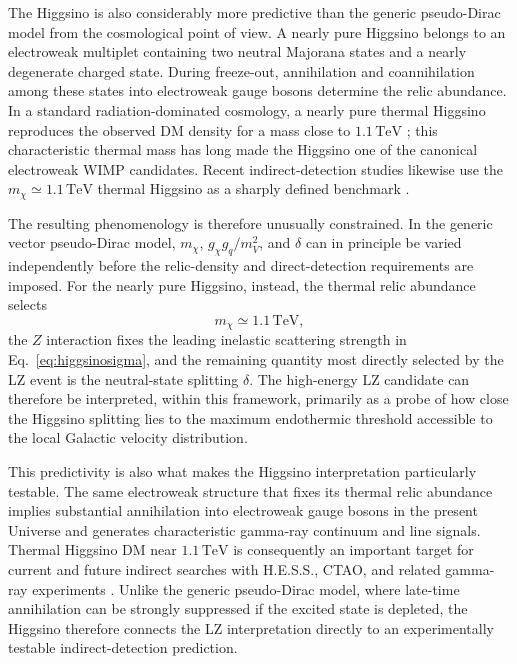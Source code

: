 \documentclass[aps,prd,reprint,superscriptaddress,nofootinbib,longbibliography,floatfix]{revtex4-2}
\newcommand{\TeV}{\mathrm{TeV}}
\begin{document}
The Higgsino is also considerably more predictive than the generic pseudo-Dirac model from the cosmological point of view. A nearly pure Higgsino belongs to an electroweak multiplet containing two neutral Majorana states and a nearly degenerate charged state. During freeze-out, annihilation and coannihilation among these states into electroweak gauge bosons determine the relic abundance. In a standard radiation-dominated cosmology, a nearly pure thermal Higgsino reproduces the observed DM density for a mass close to $1.1\,\TeV$ \cite{KrallReece2018,Rodd2024,Graham2025}; this characteristic thermal mass has long made the Higgsino one of the canonical electroweak WIMP candidates. Recent indirect-detection studies likewise use the $m_\chi\simeq1.1\,\TeV$ thermal Higgsino as a sharply defined benchmark \cite{Rodd2024}.

The resulting phenomenology is therefore unusually constrained. In the generic vector pseudo-Dirac model, $m_\chi$, $g_\chi g_q/m_V^2$, and $\delta$ can in principle be varied independently before the relic-density and direct-detection requirements are imposed. For the nearly pure Higgsino, instead, the thermal relic abundance selects
\begin{equation}
m_\chi\simeq1.1\,\TeV,
\end{equation}
the $Z$ interaction fixes the leading inelastic scattering strength in Eq.~\eqref{eq:higgsinosigma}, and the remaining quantity most directly selected by the LZ event is the neutral-state splitting $\delta$. The high-energy LZ candidate can therefore be interpreted, within this framework, primarily as a probe of how close the Higgsino splitting lies to the maximum endothermic threshold accessible to the local Galactic velocity distribution.

This predictivity is also what makes the Higgsino interpretation particularly testable. The same electroweak structure that fixes its thermal relic abundance implies substantial annihilation into electroweak gauge bosons in the present Universe and generates characteristic gamma-ray continuum and line signals. Thermal Higgsino DM near $1.1\,\TeV$ is consequently an important target for current and future indirect searches with H.E.S.S., CTAO, and related gamma-ray experiments \cite{KrallReece2018,Rodd2024}. Unlike the generic pseudo-Dirac model, where late-time annihilation can be strongly suppressed if the excited state is depleted, the Higgsino therefore connects the LZ interpretation directly to an experimentally testable indirect-detection prediction.
\end{document}
